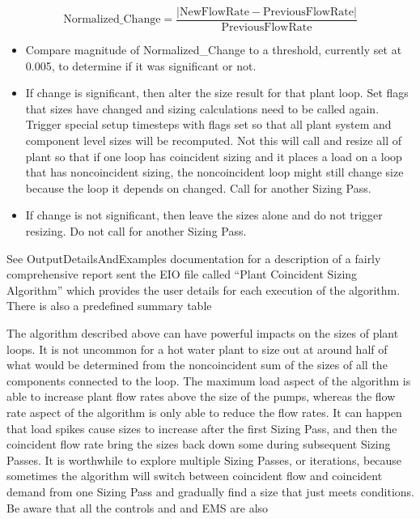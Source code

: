 \begin{equation}
  \text{Normalized_Change} = \frac{\left|\text{NewFlowRate}-\text{PreviousFlowRate}\right|}{\text{PreviousFlowRate}}
\end{equation}

\begin{itemize}
  \item
    Compare magnitude of Normalized\_Change to a threshold, currently set at 0.005, to determine if it was significant or not.
  \item
    If change is significant, then alter the size result for that plant loop. Set flags that sizes have changed and sizing calculations need to be called again. Trigger special setup timesteps with flags set so that all plant system and component level sizes will be recomputed. Not this will call and resize all of plant so that if one loop has coincident sizing and it places a load on a loop that has noncoincident sizing, the noncoincident loop might still change size because the loop it depends on changed. Call for another Sizing Pass.
  \item
    If change is not significant, then leave the sizes alone and do not trigger resizing. Do not call for another Sizing Pass.
\end{itemize}

See OutputDetailsAndExamples documentation for a description of a fairly comprehensive report sent the EIO file called ``Plant Coincident Sizing Algorithm'' which provides the user details for each execution of the algorithm. There is also a predefined summary table

The algorithm described above can have powerful impacts on the sizes of plant loops. It is not uncommon for a hot water plant to size out at around half of what would be determined from the noncoincident sum of the sizes of all the components connected to the loop. The maximum load aspect of the algorithm is able to increase plant flow rates above the size of the pumps, whereas the flow rate aspect of the algorithm is only able to reduce the flow rates. It can happen that load spikes cause sizes to increase after the first Sizing Pass, and then the coincident flow rate bring the sizes back down some during subsequent Sizing Passes. It is worthwhile to explore multiple Sizing Passes, or iterations, because sometimes the algorithm will switch between coincident flow and coincident demand from one Sizing Pass and gradually find a size that just meets conditions. Be aware that all the controls and and EMS are also
